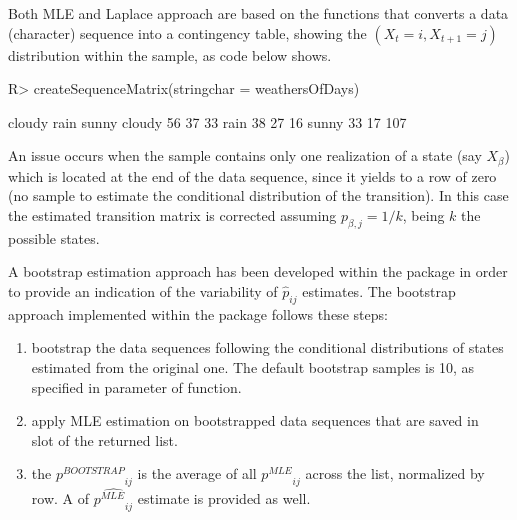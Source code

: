 \documentclass[nojss]{jss}
\begin{document}
Both MLE and Laplace approach are based on the 
functions that converts a data (character) sequence into a contingency table,
showing the $\left( X_{t}=i, X_{t+1}=j\right)$ distribution within the sample,
as code below shows. 

\begin{Schunk}
\begin{Sinput}
R> createSequenceMatrix(stringchar = weathersOfDays)
\end{Sinput}
\begin{Soutput}
       cloudy rain sunny
cloudy     56   37    33
rain       38   27    16
sunny      33   17   107
\end{Soutput}
\end{Schunk}


An issue occurs when the sample contains only one realization of a state (say $X_{\beta}$) which is located at the end of the data sequence, since it yields to a row of zero (no sample to estimate the conditional
distribution of the transition). In this case the estimated transition matrix is
corrected assuming $p_{\beta,j}=1/k$, being $k$ the possible states.

A bootstrap estimation approach has been developed within the package in order
to provide an indication of the variability of ${\hat p}_{ij}$ estimates. The
bootstrap approach implemented within the  package follows
these steps:

\begin{enumerate}
  \item bootstrap the data sequences following the conditional
  distributions of states estimated from the original one. The default bootstrap
  samples is 10, as specified in  parameter of 
  function.
  \item apply MLE estimation on bootstrapped data sequences that are saved in
\\   slot of the returned list.
  \item the ${p^{BOOTSTRAP}}_{ij}$ is the average of all ${p^{MLE}}_{ij}$ across
  the  list, normalized by row. A 
 of $\hat{{p^{MLE}}_{ij}}$ estimate is provided as well.
\end{enumerate}
\end{document}
